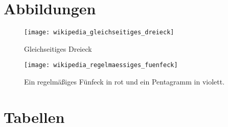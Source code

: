 \begin{appendices}


\begin{comment}
--------------------------------------------------------------------------------
\end{comment}
\chapter{Abbildungen}


\begin{figure}[ht]
	\centering
	\texttt{[image: wikipedia\_gleichseitiges\_dreieck]}
	\caption{Gleichseitiges Dreieck \cite{wikipedia2018dreieck}}
	\label{fig:wikipedia_gleichseitiges_dreieck}
\end{figure}



\begin{figure}[ht]
	\centering
	\texttt{[image: wikipedia\_regelmaessiges\_fuenfeck]}
	\caption{Ein regelmäßiges Fünfeck in rot und ein Pentagramm in violett. \cite{wikipedia2018fuenfeck}}
	\label{fig:wikipedia_regelmaessiges_fuenfeck}
\end{figure}


\begin{comment}
--------------------------------------------------------------------------------
\end{comment}
\chapter{Tabellen}


\end{appendices}
